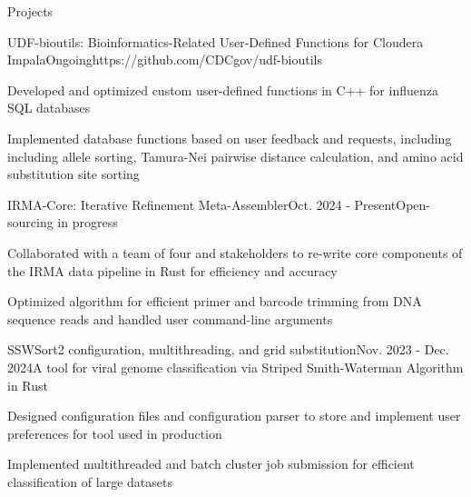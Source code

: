 \documentclass{resume} %
\begin{document}
\begin{rSection}{Projects}
\itemsep -2pt


  \begin{rSubsection}{UDF-bioutils: Bioinformatics-Related User-Defined Functions for Cloudera Impala}{Ongoing}{https://github.com/CDCgov/udf-bioutils}{}
  \item Developed and optimized custom user-defined functions in C++ for influenza SQL databases
  \item Implemented database functions based on user feedback and requests, including including allele sorting, Tamura-Nei pairwise distance calculation, and amino acid substitution site sorting
  \end{rSubsection}

  \begin{rSubsection}{IRMA-Core: Iterative Refinement Meta-Assembler}{Oct. 2024 - Present}{Open-sourcing in progress}{}
  \item Collaborated with a team of four and stakeholders to re-write core components of the IRMA data pipeline in Rust for efficiency and accuracy
  \item Optimized algorithm for efficient primer and barcode trimming from DNA sequence reads and handled user command-line arguments
  \end{rSubsection}

  \pagebreak

  \begin{rSubsection}{SSWSort2 configuration, multithreading, and grid substitution}{Nov. 2023 - Dec. 2024}{A tool for viral genome classification via Striped Smith-Waterman Algorithm in Rust}{}
  \item Designed configuration files and configuration parser to store and implement user preferences for tool used in production
  \item Implemented multithreaded and batch cluster job submission for efficient classification of large datasets
  \end{rSubsection}


\end{rSection}
\end{document}
